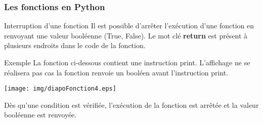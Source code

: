 \documentclass[9pt]{beamer}
\begin{document}
\begin{frame}
\frametitle{Les fonctions en Python}

\begin{block}{Interruption d'une fonction}
Il est possible d'arrêter l'exécution d'une fonction en renvoyant une valeur booléenne (True, False). Le mot clé \textbf{return} est présent à plusieurs endroits dans le code de la fonction.
\end{block}

\begin{exampleblock}{Exemple}
La fonction ci-dessous contient une instruction print. L'affichage ne se réalisera pas cas la fonction renvoie un booléen avant l'instruction print.

\begin{center}
\texttt{[image: img/diapoFonction4.eps]}
\end{center}

Dès qu'une condition est vérifiée, l'exécution de la fonction est arrêtée et la valeur booléenne est renvoyée.
\end{exampleblock}
\end{frame}
\end{document}
